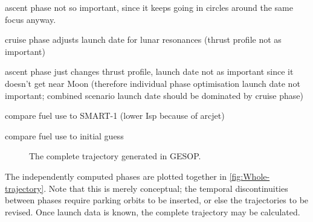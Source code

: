 ascent phase not so important, since it keeps going in circles around the same focus anyway.

cruise phase adjusts launch date for lunar resonances (thrust profile not as important)

ascent phase just changes thrust profile, launch date not as important since it doesn't get near Moon (therefore individual phase optimisation launch date not important; combined scenario launch date should be dominated by cruise phase)

compare fuel use to SMART-1 (lower Isp because of arcjet)

compare fuel use to initial guess


\begin{figure}
\centering
\def\svgwidth{\textwidth}

\caption{The complete trajectory generated in GESOP.}
\label{fig:Whole-trajectory}
\end{figure}

The independently computed phases are plotted together in \autoref{fig:Whole-trajectory}. Note that this is merely conceptual; the temporal discontinuities between phases require parking orbits to be inserted, or else the trajectories to be revised. Once launch data is known, the complete trajectory may be calculated.
